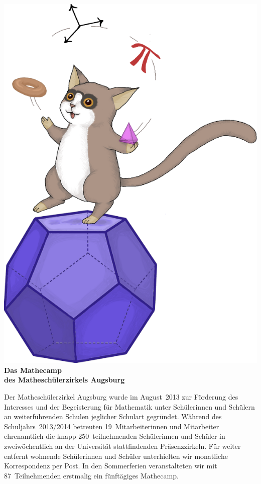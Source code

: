 \documentclass[12pt]{zettel}
\begin{document}
\pagestyle{plain}

\renewcommand{\betreff}{}

\vspace{-2em}

\begin{center}
  {\qquad\quad}\includegraphics[scale=0.18]{cover}\\[1cm]

  \Large\textbf{\textsf{Das Mathecamp \\ des Matheschülerzirkels Augsburg}}
\end{center}

\vspace{1em}

Der Matheschülerzirkel Augsburg wurde im August~2013 zur Förderung des
Interesses und der Begeisterung für Mathematik unter Schülerinnen und Schülern
an weiterführenden Schulen jeglicher Schulart gegründet. Während des Schuljahrs~2013/2014 betreuten
19~Mitarbeiterinnen und Mitarbeiter ehrenamtlich die knapp
250~teilnehmenden Schülerinnen und Schüler in zweiwöchentlich an der
Universität stattfindenden Präsenzzirkeln. Für weiter entfernt wohnende Schülerinnen
und Schüler unterhielten wir monatliche Korrespondenz per Post. In den
Sommerferien veranstalteten wir mit 87~Teilnehmenden erstmalig ein fünftägiges Mathecamp.
\end{document}
